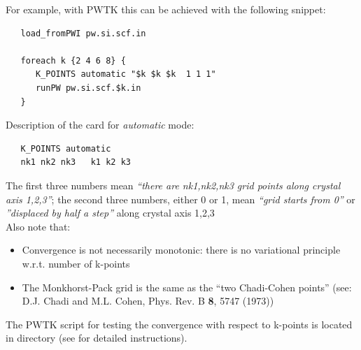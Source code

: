 \documentclass[landscape]{foils}
\begin{document}
For example, with PWTK this can be achieved with the following snippet:
{\codecolor
\begin{verbatim}
   load_fromPWI pw.si.scf.in

   foreach k {2 4 6 8} {
      K_POINTS automatic "$k $k $k  1 1 1"
      runPW pw.si.scf.$k.in
   }
\end{verbatim}
}

%
Description of the  card for {\em automatic} mode:
{\cardcolor
\begin{verbatim}
   K_POINTS automatic
   nk1 nk2 nk3   k1 k2 k3
\end{verbatim}
}

The first three  numbers mean {\em ``there are
  nk1,nk2,nk3 grid points along crystal axis 1,2,3''}; the second
three  numbers, either 0 or 1, mean {\em ``grid starts
  from 0''} or {\em ''displaced by half a step''} along crystal axis
1,2,3\\

Also note that:
\begin{itemize}
\item  Convergence is not necessarily monotonic: 
  there is no variational principle w.r.t. number of k-points
\item  The  Monkhorst-Pack grid is the same as 
  the ``two Chadi-Cohen points'' {\small (see: D.J. Chadi and
M.L. Cohen, Phys. Rev. B {\bf 8}, 5747 (1973))}
\end{itemize}

%
The PWTK script for testing the convergence with respect to k-points is
located in
 directory (see 
for detailed instructions).
\end{document}
